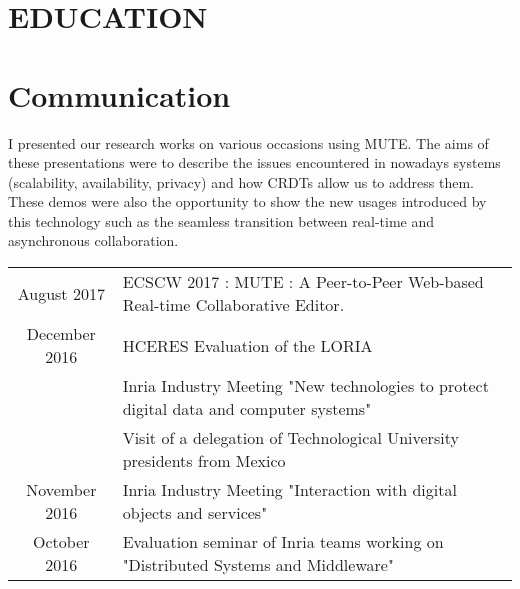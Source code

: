 \documentclass[]{deedy-resume-openfont}
\begin{document}
\section{EDUCATION}

\descript{}
\sectionsep


\section{Communication}

I presented our research works on various occasions using MUTE.
The aims of these presentations were to describe the issues encountered
in nowadays systems (scalability, availability, privacy) and how \acp{CRDT} allow us to address them.
These demos were also the opportunity to show the new usages introduced by this technology
such as the seamless transition between real-time and asynchronous collaboration.


\vspace{5pt}
\begin{tabular}{cp{150mm}}
August 2017         & ECSCW 2017 : MUTE : A Peer-to-Peer Web-based Real-time Collaborative Editor.\\
December 2016       & HCERES Evaluation of the LORIA\\
                    & Inria Industry Meeting "New technologies to protect digital data and computer systems"\\
                    & Visit of a delegation of Technological University presidents from Mexico\\
November 2016       & Inria Industry Meeting "Interaction with digital objects and services"\\
October 2016        & Evaluation seminar of Inria teams working on "Distributed Systems and Middleware"\\
\end{tabular}

\hfill
\end{document}
